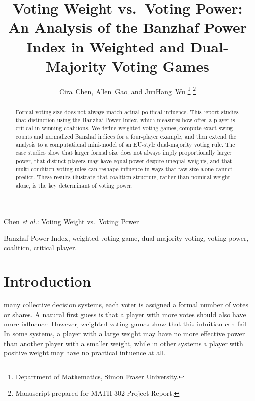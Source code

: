 \documentclass[lettersize,journal]{IEEEtran}
\begin{document}
\title{Voting Weight vs.\ Voting Power:\\
An Analysis of the Banzhaf Power Index in Weighted and Dual-Majority Voting Games}

\author{
Cira~Chen, Allen~Gao, and JunHang~Wu%
\thanks{Department of Mathematics, Simon Fraser University.}%
\thanks{Manuscript prepared for MATH 302 Project Report.}
}

%
{Chen \MakeLowercase{\textit{et al.}}: Voting Weight vs.\ Voting Power}

\maketitle

\begin{abstract}
Formal voting size does not always match actual political influence. This report studies that distinction using the Banzhaf Power Index, which measures how often a player is critical in winning coalitions. We define weighted voting games, compute exact swing counts and normalized Banzhaf indices for a four-player example, and then extend the analysis to a computational mini-model of an EU-style dual-majority voting rule. The case studies show that larger formal size does not always imply proportionally larger power, that distinct players may have equal power despite unequal weights, and that multi-condition voting rules can reshape influence in ways that raw size alone cannot predict. These results illustrate that coalition structure, rather than nominal weight alone, is the key determinant of voting power.
\end{abstract}

\begin{IEEEkeywords}
Banzhaf Power Index, weighted voting game, dual-majority voting, voting power, coalition, critical player.
\end{IEEEkeywords}

\section{Introduction}
 many collective decision systems, each voter is assigned a formal number of votes or shares. A natural first guess is that a player with more votes should also have more influence. However, weighted voting games show that this intuition can fail. In some systems, a player with a large weight may have no more effective power than another player with a smaller weight, while in other systems a player with positive weight may have no practical influence at all.
\end{document}
